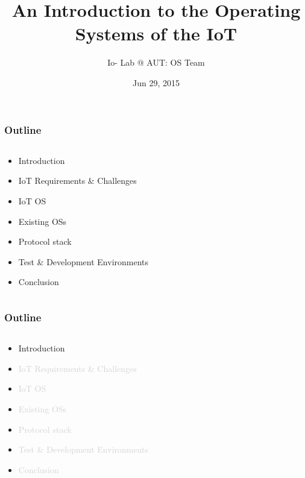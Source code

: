 \documentclass{beamer}
\title[Operating Systems of the IoT]{An Introduction to the Operating Systems of the IoT}
\author{Io- Lab @ AUT: OS Team}
\institute[] {
  Amirkabir University of Technology \\
  \medskip
  {\small\tt elahejalalpoor@gmail.com}\\
  {\small\tt parham.alvani@gmail.com}
  \medskip
}
\date{Jun 29, 2015}
\begin{document}
\begin{frame}
\titlepage
\end{frame}


\begin{frame}
	\frametitle{Outline}
	\begin{columns}[c]
		\begin{column}{30cm}
			\vspace{.1cm}
			\begin{itemize}
				\justifying
				\item Introduction
				\item IoT Requirements \& Challenges
				\item IoT OS
				\item Existing OSs
				\item Protocol stack
				\item Test \& Development Environments
				\item Conclusion
			\end{itemize}
		\end{column}
	\end{columns}
\end{frame}

\begin{frame}
	\frametitle{Outline}
	\begin{columns}[c]
		\begin{column}{30cm}
			\vspace{.1cm}
			\begin{itemize}
				\justifying
				\item Introduction
				\item \textcolor{LightGray}{IoT Requirements \& Challenges}
				\item \textcolor{LightGray}{IoT OS}
				\item \textcolor{LightGray}{Existing OSs}
				\item \textcolor{LightGray}{Protocol stack}
				\item \textcolor{LightGray}{Test \& Development Environments}
				\item \textcolor{LightGray}{Conclusion}
			\end{itemize}
		\end{column}
	\end{columns}
\end{frame}
\end{document}
